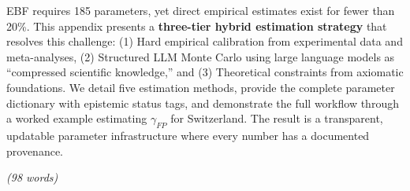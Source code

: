 \documentclass[11pt,a4paper]{article}
\theoremstyle{definition}
\begin{document}
\begin{tcolorbox}[colback=white, colframe=black,
    title=\textbf{Abstract}]

EBF requires 185 parameters, yet direct empirical estimates exist for fewer 
than 20\%. This appendix presents a \textbf{three-tier hybrid estimation strategy} 
that resolves this challenge: (1) Hard empirical calibration from experimental 
data and meta-analyses, (2) Structured LLM Monte Carlo using large language 
models as ``compressed scientific knowledge,'' and (3) Theoretical constraints 
from axiomatic foundations. We detail five estimation methods, provide the 
complete parameter dictionary with epistemic status tags, and demonstrate the 
full workflow through a worked example estimating $\gamma_{FP}$ for Switzerland. 
The result is a transparent, updatable parameter infrastructure where every 
number has a documented provenance.

\textit{(98 words)}

\end{tcolorbox}

\end{document}
